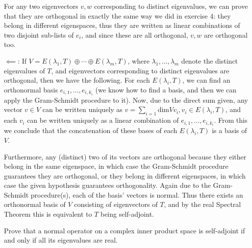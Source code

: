 \begin{solution}
    For any two eigenvectors $v, w$ corresponding to distinct eigenvalues, we can prove that they are orthogonal in exactly the same way we did in exercise 4: they belong in different eigenspaces, thus they are written as linear combinations of two disjoint sub-lists of $e_i$, and since these are all orthogonal, $v, w$ are orthogonal too.

    $\impliedby$: If $V = E(\lambda_1, T) \oplus \cdots \oplus E(\lambda_m, T)$,
    where $\lambda_1, \ldots, \lambda_m$ denote the distinct eigenvalues of $T$, and eigenvectors corresponding to distinct eigenvalues are orthogonal, then we have the following. For each $E(\lambda_i, T)$, we can find an orthonormal basis $e_{i, 1}, \ldots, e_{i, k_i}$ (we know how to find a basis, and then we can apply the Gram-Schmidt procedure to it). Now, due to the direct sum given, any vector $v \in V$ can be written uniquely as $v = \sum_{i=1}{\text{dim} V}v_i, v_i \in E(\lambda_i, T)$, and each $v_i$ can be written uniquely as a linear combination of $e_{i, 1}, \ldots, e_{i, k_i}$. From this we conclude that the concatenation of these bases of each $E(\lambda_i, T)$ is a basis of $V$. 
    
    Furthermore, any (distinct) two of its vectors are orthogonal because they either belong in the same eigenspace, in which case the Gram-Schmidt procedure guarantees they are orthogonal, or they belong in different eigenspaces, in which case the given hypothesis guarantees orthogonality. Again due to the Gram-Schmidt procedure(s), each of the basis' vectors is normal. Thus there exists an orthonormal basis of $V$ consisting of eigenvectors of $T$, and by the real Spectral Theorem this is equivalent to $T$ being self-adjoint.
    
\end{solution}

\begin{exercise}{6}
    Prove that a normal operator on a complex inner product space is self-adjoint if and only if all its eigenvalues are real.
\end{exercise}

